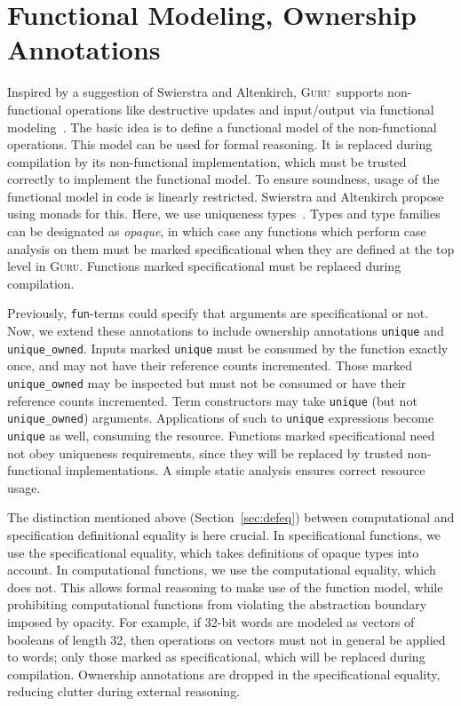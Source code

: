 \documentclass[9pt,natbib]{sigplanconf}
\newcommand{\guru}[0]{\textsc{Guru}}
\begin{document}
\section{Functional Modeling, Ownership Annotations}
\label{sec:model}

Inspired by a suggestion of Swierstra and Altenkirch, \guru\ supports
non-functional operations like destructive updates and input/output
via functional modeling~\cite{swierstra+07}.  The basic idea is to
define a functional model of the non-functional operations.  This
model can be used for formal reasoning.  It is replaced during
compilation by its non-functional implementation, which must be
trusted correctly to implement the functional model.  To ensure
soundness, usage of the functional model in code is linearly
restricted.  Swierstra and Altenkirch propose using monads for this.
Here, we use uniqueness types~\cite{barendsen+93}.  Types and type
families can be designated as \emph{opaque}, in which case any
functions which perform case analysis on them must be marked
specificational when they are defined at the top level in
\textsc{Guru}. Functions marked specificational must be replaced
during compilation.

Previously, \texttt{fun}-terms could specify that arguments are
specificational or not.  Now, we extend these annotations to include
ownership annotations \texttt{unique} and \texttt{unique\_owned}.
Inputs marked \texttt{unique} must be consumed by the function exactly
once, and may not have their reference counts incremented.  Those
marked \texttt{unique\_owned} may be inspected but must not be
consumed or have their reference counts incremented.  Term
constructors may take \texttt{unique} (but not \texttt{unique\_owned})
arguments.  Applications of such to \texttt{unique} expressions become
\texttt{unique} as well, consuming the resource.  Functions marked
specificational need not obey uniqueness requirements, since they will
be replaced by trusted non-functional implementations.  A simple
static analysis ensures correct resource usage.

The distinction mentioned above (Section~\ref{sec:defeq}) between
computational and specification definitional equality is here crucial.
In specificational functions, we use the specificational equality,
which takes definitions of opaque types into account.  In
computational functions, we use the computational equality, which does
not.  This allows formal reasoning to make use of the function model,
while prohibiting computational functions from violating the
abstraction boundary imposed by opacity.  For example, if 32-bit words
are modeled as vectors of booleans of length 32, then operations on
vectors must not in general be applied to words; only those marked as
specificational, which will be replaced during compilation.  Ownership
annotations are dropped in the specificational equality, reducing
clutter during external reasoning.  
\end{document}
